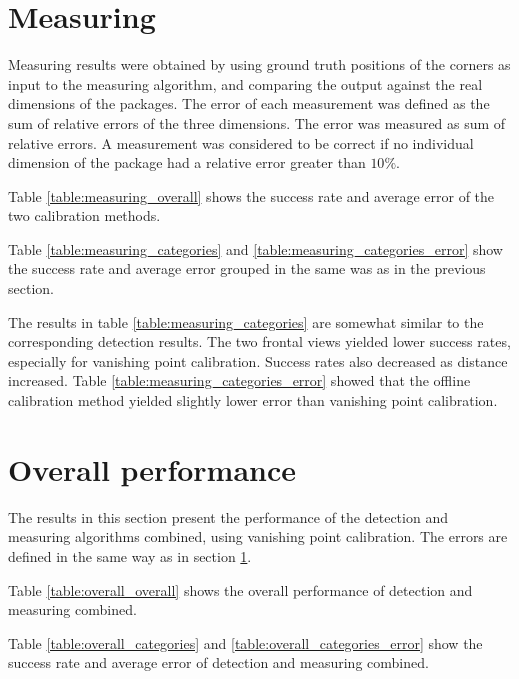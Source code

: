 \section{Measuring} \label{results:measuring} 
Measuring results were obtained by using ground truth positions of the corners as input to the measuring algorithm, and comparing the output against the real dimensions of the packages.
The error of each measurement was defined as the sum of relative errors of the three dimensions.
The error was measured as sum of relative errors.
A measurement was considered to be correct if no individual dimension of the package had a relative error greater than $10\%$.

Table \ref{table:measuring_overall} shows the success rate and average error of the two calibration methods.


Table \ref{table:measuring_categories} and \ref{table:measuring_categories_error} show the success rate and average error grouped in the same was as in the previous section.





The results in table \ref{table:measuring_categories} are somewhat similar to the corresponding detection results.
The two frontal views yielded lower success rates, especially for vanishing point calibration.
Success rates also decreased as distance increased.
Table \ref{table:measuring_categories_error} showed that the offline calibration method yielded slightly lower error than vanishing point calibration.

\section{Overall performance} \label{results:overall}
The results in this section present the performance of the detection and measuring algorithms combined, using vanishing point calibration.
The errors are defined in the same way as in section \ref{results:measuring}.

Table \ref{table:overall_overall} shows the overall performance of detection and measuring combined.



Table \ref{table:overall_categories} and \ref{table:overall_categories_error} show the success rate and average error of detection and measuring combined.

